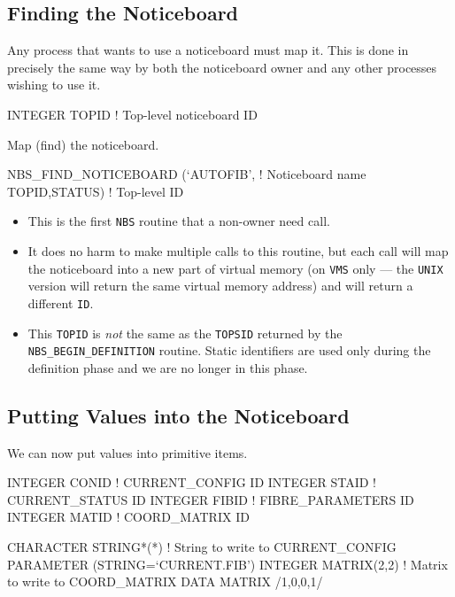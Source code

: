 \documentclass[twoside,11pt,nolof]{starlink}
\begin{document}
\subsection {Finding the Noticeboard}

Any process that wants to use a noticeboard must map it. This is done in
precisely the same way by both the noticeboard owner and any other processes
wishing to use it.

\begin{terminalv}
INTEGER   TOPID                           ! Top-level noticeboard ID
\end{terminalv}

Map (find) the noticeboard.

\begin{terminalv}
NBS_FIND_NOTICEBOARD (`AUTOFIB',          ! Noticeboard name
                      TOPID,STATUS)       ! Top-level ID
\end{terminalv}

\begin {itemize}
\item This is the first \texttt{NBS} routine that a non-owner need call.
\item It does no harm to make multiple calls to this routine, but each call will
map the noticeboard into a new part of virtual memory (on \texttt{VMS} only ---
the \texttt{UNIX} version will return the same virtual memory address) and will
return a different \texttt{ID}.
\item This \texttt{TOPID} is \emph{not} the same as the \texttt{TOPSID} returned by
the \texttt{NBS\_BEGIN\_DEFINITION} routine. Static identifiers are used only
during the definition phase and we are no longer in this phase.
\end {itemize}

\subsection {Putting Values into the Noticeboard}

We can now put values into primitive items.

\begin{terminalv}
INTEGER   CONID                   ! CURRENT_CONFIG ID
INTEGER   STAID                   ! CURRENT_STATUS ID
INTEGER   FIBID                   ! FIBRE_PARAMETERS ID
INTEGER   MATID                   ! COORD_MATRIX ID

CHARACTER STRING*(*)              ! String to write to CURRENT_CONFIG
PARAMETER (STRING=`CURRENT.FIB')
INTEGER   MATRIX(2,2)             ! Matrix to write to COORD_MATRIX
DATA      MATRIX /1,0,0,1/
\end{terminalv}
\end{document}
